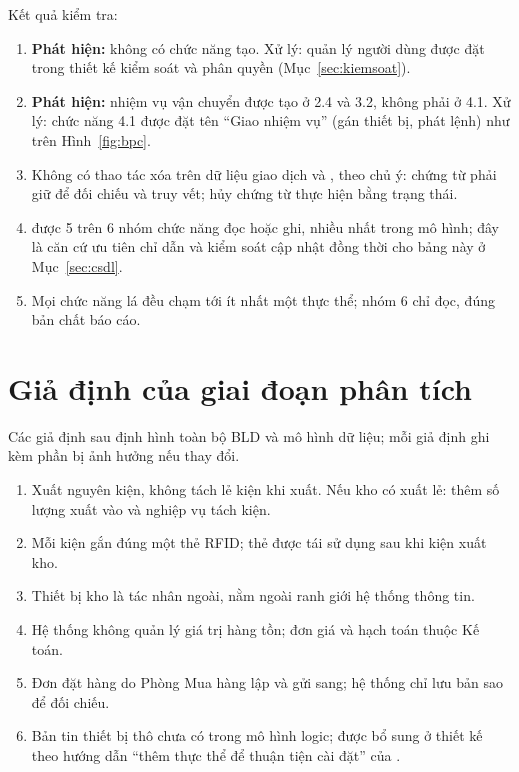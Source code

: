 Kết quả kiểm tra:
\begin{enumerate}
  \item \textbf{Phát hiện:}  không có chức năng tạo. Xử lý: quản lý người dùng được đặt trong thiết kế kiểm soát và phân quyền (Mục~\ref{sec:kiemsoat}).
  \item \textbf{Phát hiện:} nhiệm vụ vận chuyển được tạo ở 2.4 và 3.2, không phải ở 4.1. Xử lý: chức năng 4.1 được đặt tên “Giao nhiệm vụ” (gán thiết bị, phát lệnh) như trên Hình~\ref{fig:bpc}.
  \item Không có thao tác xóa trên dữ liệu giao dịch và , theo chủ ý: chứng từ phải giữ để đối chiếu và truy vết; hủy chứng từ thực hiện bằng trạng thái.
  \item {} được 5 trên 6 nhóm chức năng đọc hoặc ghi, nhiều nhất trong mô hình; đây là căn cứ ưu tiên chỉ dẫn và kiểm soát cập nhật đồng thời cho bảng này ở Mục~\ref{sec:csdl}.
  \item Mọi chức năng lá đều chạm tới ít nhất một thực thể; nhóm 6 chỉ đọc, đúng bản chất báo cáo.
\end{enumerate}

\section{Giả định của giai đoạn phân tích}
\label{sec:giadinh}

Các giả định sau định hình toàn bộ BLD và mô hình dữ liệu; mỗi giả định ghi kèm phần bị ảnh hưởng nếu thay đổi.
\begin{enumerate}
  \item Xuất nguyên kiện, không tách lẻ kiện khi xuất. Nếu kho có xuất lẻ: thêm số lượng xuất vào  và nghiệp vụ tách kiện.
  \item Mỗi kiện gắn đúng một thẻ RFID; thẻ được tái sử dụng sau khi kiện xuất kho.
  \item Thiết bị kho là tác nhân ngoài, nằm ngoài ranh giới hệ thống thông tin.
  \item Hệ thống không quản lý giá trị hàng tồn; đơn giá và hạch toán thuộc Kế toán.
  \item Đơn đặt hàng do Phòng Mua hàng lập và gửi sang; hệ thống chỉ lưu bản sao để đối chiếu.
  \item Bản tin thiết bị thô chưa có trong mô hình logic; được bổ sung ở thiết kế theo hướng dẫn “thêm thực thể để thuận tiện cài đặt” của \cite[Ch.~7]{tung_qlhttt}.
\end{enumerate}

